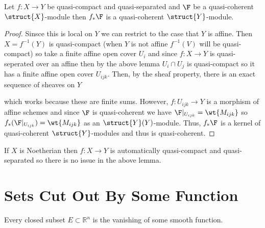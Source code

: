 \documentclass[12pt]{article}
\begin{document}
\begin{lemma}
Let $f : X \to Y$ be quasi-compact and quasi-separated and $\F$ be a quasi-coherent $\struct{X}$-module then $f_* \F$ is a quasi-coherent $\struct{Y}$-module.
\end{lemma}

\begin{proof}
Sinsce this is local on $Y$ we can restrict to the case that $Y$ is affine. Then   $X = f^{-1}(Y)$ is quasi-compact (when $Y$ is not affine $f^{-1}(V)$ will be quasi-compact) so take a finite affine open cover $U_i$ and since $f : X \to Y$ is quasi-seperated over an affine then by the above lemma $U_i \cap U_j$ is quasi-compact so it has a finite affine open cover $U_{ijk}$. Then, by the sheaf property, there is an exact sequence of sheaves on $Y$
\begin{center}
\end{center}
which works because these are finite sums. However, $f : U_{ijk} \to Y$ is a morphism of affine schemes and since $\F$ is quasi-coherent we have $\F |_{U_{ijk}} = \wt{M_{ijk}}$ so $f_* (\F|_{U_{ijk}}) = \wt{M_{ijk}}$ as an $\struct{Y}(Y)$-module. Thus, $f_* \F$ is a kernel of quasi-coherent $\struct{Y}$-modules and thus is quasi-coherent. 
\end{proof}

\begin{rmk}
If $X$ is Noetherian then $f : X \to Y$ is automatically quasi-compact and quasi-separated so there is no issue in the above lemma.
\end{rmk}

\section{Sets Cut Out By Some Function}

\newcommand{\R}{\mathbb{R}}

\begin{theorem}
Every closed subset $E \subset \R^n$ is the vanishing of some smooth function.
\end{theorem}
\end{document}
